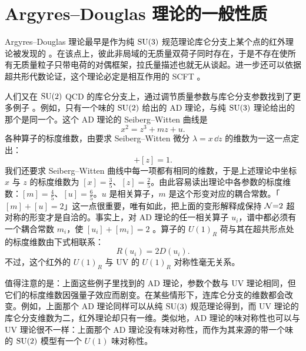 \section{Argyres--Douglas 理论的一般性质}
\label{sec:general}

Argyres--Douglas 理论最早是作为纯 $\operatorname{SU}(3)$ 规范理论库仑分支上某个点的红外理论被发现的 \cite{6}。在该点上，彼此非局域的无质量双荷子同时存在，于是不存在使所有无质量粒子只带电荷的对偶框架，拉氏量描述也就无从谈起。进一步还可以依据超共形代数论证，这个理论必定是相互作用的 SCFT \cite{11}。

人们又在 $\operatorname{SU}(2)$ QCD 的库仑分支上，通过调节质量参数与库仑分支参数找到了更多例子 \cite{11}。例如，只有一个味的 $\operatorname{SU}(2)$ 给出的 AD 理论，与纯 $\operatorname{SU}(3)$ 理论给出的那个是同一个。这个 AD 理论的 Seiberg--Witten 曲线是
\begin{equation}
x^2 = z^3 + m z + u .
\label{eq:2.1}\tag{2.1}
\end{equation}
各种算子的标度维数，由要求 Seiberg--Witten 微分 $\lambda = x\,\dd z$ 的维数为一这一点定出：
\begin{equation}
[x] + [z] = 1 .
\label{eq:2.2}\tag{2.2}
\end{equation}
我们还要求 Seiberg--Witten 曲线中每一项都有相同的维数，于是上述理论中坐标 $x$ 与 $z$ 的标度维数为 $[x]=\tfrac{3}{5}$、$[z]=\tfrac{2}{5}$。由此容易读出理论中各参数的标度维数：$[m]=\tfrac{4}{5}$、$[u]=\tfrac{6}{5}$。$u$ 是相关算子，$m$ 是这个形变对应的耦合常数。「$[m]+[u]=2$」这一点很重要，唯有如此，把上面的变形解释成保持 $\mathcal{N}{=}2$ 超对称的形变才是自洽的。事实上，对 AD 理论的任一相关算子 $u_i$，谱中都必须有一个耦合常数 $m_i$，使 $[u_i]+[m_i]=2$ \cite{11}。算子的 $U(1)_R$ 荷与其在超共形点处的标度维数由下式相联系：
\begin{equation}
R(u_i) = 2D(u_i) .
\label{eq:2.3}\tag{2.3}
\end{equation}
不过，这个红外的 $U(1)_R$ 与 UV 的 $U(1)_R$ 对称性毫无关系。

值得注意的是：上面这些例子里找到的 AD 理论，参数个数与 UV 理论相同，但它们的标度维数因强量子效应而剧变。在某些情形下，连库仑分支的维数都会改变。例如，上面那个 AD 理论同样可以从纯 $\operatorname{SU}(3)$ 规范理论得到，而 UV 理论的库仑分支维数为二，红外理论却只有一维。类似地，AD 理论的味对称性也可以与 UV 理论很不一样：上面那个 AD 理论没有味对称性，而作为其来源的带一个味的 $\operatorname{SU}(2)$ 模型有一个 $U(1)$ 味对称性。

